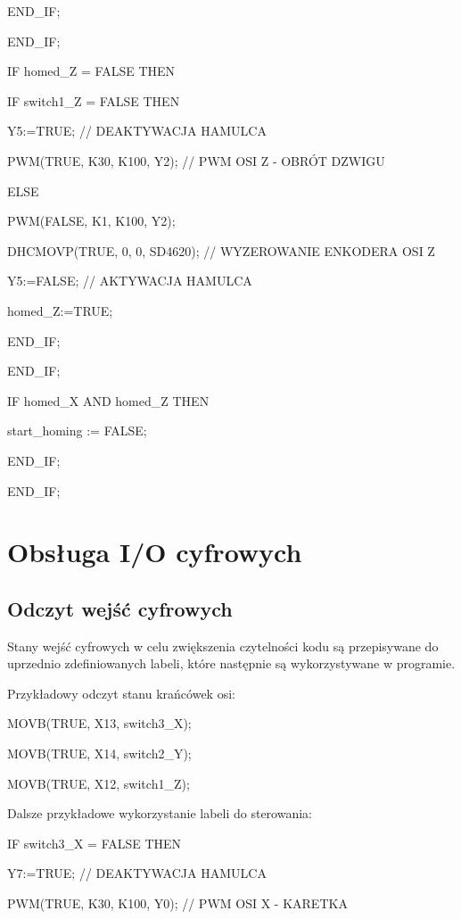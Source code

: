 \documentclass{mwrep}
\begin{document}
\quad \quad END\_IF;

\quad END\_IF;

\quad IF homed\_Z = FALSE THEN

\quad \quad IF switch1\_Z = FALSE THEN

\quad \quad \quad Y5:=TRUE; // DEAKTYWACJA HAMULCA

\quad \quad \quad PWM(TRUE, K30, K100, Y2); // PWM OSI Z - OBRÓT DZWIGU

\quad \quad \quad ELSE

\quad \quad \quad PWM(FALSE, K1, K100, Y2);

\quad \quad \quad DHCMOVP(TRUE, 0, 0, SD4620); // WYZEROWANIE ENKODERA OSI Z

\quad \quad \quad Y5:=FALSE; // AKTYWACJA HAMULCA

\quad \quad \quad homed\_Z:=TRUE;

\quad \quad END\_IF;

\quad END\_IF;
		
\quad IF homed\_X AND homed\_Z THEN

\quad \quad start\_homing := FALSE;

\quad END\_IF;

END\_IF;


\section{Obsługa I/O cyfrowych}
\label{PLC::IOCyfrowe}

\subsection{Odczyt wejść cyfrowych}
Stany wejść cyfrowych w celu zwiększenia czytelności kodu są przepisywane do uprzednio zdefiniowanych labeli, które następnie są wykorzystywane w programie.
	
Przykładowy odczyt stanu krańcówek osi:
	
MOVB(TRUE, X13, switch3\_X);

MOVB(TRUE, X14, switch2\_Y);

MOVB(TRUE, X12, switch1\_Z);



Dalsze przykładowe wykorzystanie labeli do sterowania:

IF switch3\_X = FALSE THEN

\quad Y7:=TRUE; // DEAKTYWACJA HAMULCA

\quad PWM(TRUE, K30, K100, Y0); // PWM OSI X - KARETKA
\end{document}
